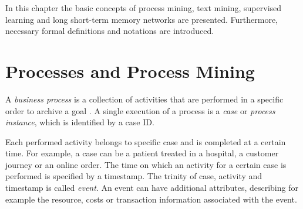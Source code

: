 In this chapter the basic concepts of process mining, text mining, supervised learning and long short-term memory networks are presented. Furthermore, necessary formal definitions and notations are introduced.

\section{Processes and Process Mining}

\begin{definition}
	A \textit{business process} is a collection of activities that are performed in a specific order to archive a goal \cite{DBLP:conf/bpm/AalstAM11}.
	A single execution of a process is a \textit{case} or \textit{process instance}, which is identified by a case ID.
\end{definition}

Each performed activity belongs to specific case and is completed at a certain time.
For example, a case can be a patient treated in a hospital, a customer journey or an online order. The time on which an activity for a certain case is performed is specified by a timestamp.
The trinity of case, activity and timestamp is called \textit{event}.
An event can have additional attributes, describing for example the resource, costs or transaction information associated with the event.

